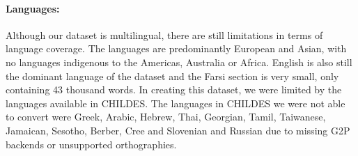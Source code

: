 \paragraph{Languages:} Although our dataset is multilingual, there are still limitations in terms of language coverage. The languages are predominantly European and Asian, with no languages indigenous to the Americas, Australia or Africa. English is also still the dominant language of the dataset and the Farsi section is very small, only containing 43 thousand words. In creating this dataset, we were limited by the languages available in CHILDES. The languages in CHILDES we were not able to convert were Greek, Arabic, Hebrew, Thai, Georgian, Tamil, Taiwanese, Jamaican, Sesotho, Berber, Cree and Slovenian and Russian due to missing G2P backends or unsupported orthographies.
